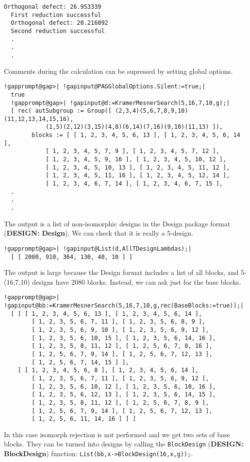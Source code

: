 \documentclass[a4paper,11pt]{report}
\begin{document}
{{\begin{Verbatim}[commandchars=@|A,fontsize=\small,frame=single,label=Example]
  Orthogonal defect: 26.953339
  First reduction successful
  Orthogonal defect: 20.216092
  Second reduction successful
  .
  .
  .
\end{Verbatim}
 Comments during the calculation can be supressed by setting global options. 
\begin{Verbatim}[commandchars=!@|,fontsize=\small,frame=single,label=Example]
  !gapprompt@gap>| !gapinput@PAGGlobalOptions.Silent:=true;|
  true
  !gapprompt@gap>| !gapinput@d:=KramerMesnerSearch(5,16,7,10,g);|
  [ rec( autSubgroup := Group([ (2,3,4)(5,6,7,8,9,10)(11,12,13,14,15,16), 
            (1,5)(2,12)(3,15)(4,8)(6,14)(7,16)(9,10)(11,13) ]), 
        blocks := [ [ 1, 2, 3, 4, 5, 6, 13 ], [ 1, 2, 3, 4, 5, 6, 14 ], 
            [ 1, 2, 3, 4, 5, 7, 9 ], [ 1, 2, 3, 4, 5, 7, 12 ], 
            [ 1, 2, 3, 4, 5, 9, 16 ], [ 1, 2, 3, 4, 5, 10, 12 ], 
            [ 1, 2, 3, 4, 5, 10, 13 ], [ 1, 2, 3, 4, 5, 11, 12 ], 
            [ 1, 2, 3, 4, 5, 11, 16 ], [ 1, 2, 3, 4, 5, 12, 14 ], 
            [ 1, 2, 3, 4, 6, 7, 14 ], [ 1, 2, 3, 4, 6, 7, 15 ], 
  .
  .
  .
\end{Verbatim}
 The output is a list of non-isomorphic designs in the \textsf{Design} package format  (\textbf{DESIGN: Design}). We can check that it is really a 5-design. 
\begin{Verbatim}[commandchars=!@|,fontsize=\small,frame=single,label=Example]
  !gapprompt@gap>| !gapinput@List(d,AllTDesignLambdas);|
  [ [ 2080, 910, 364, 130, 40, 10 ] ]
\end{Verbatim}
 The output is large because the \textsf{Design} format includes a list of all blocks, and 5-(16,7,10) designs have 2080
blocks. Instead, we can ask just for the base blocks. 
\begin{Verbatim}[commandchars=!@|,fontsize=\small,frame=single,label=Example]
  !gapprompt@gap>| !gapinput@bb:=KramerMesnerSearch(5,16,7,10,g,rec(BaseBlocks:=true));|
  [ [ [ 1, 2, 3, 4, 5, 6, 13 ], [ 1, 2, 3, 4, 5, 6, 14 ], 
        [ 1, 2, 3, 5, 6, 7, 11 ], [ 1, 2, 3, 5, 6, 8, 9 ], 
        [ 1, 2, 3, 5, 6, 9, 10 ], [ 1, 2, 3, 5, 6, 9, 12 ], 
        [ 1, 2, 3, 5, 6, 10, 15 ], [ 1, 2, 3, 5, 6, 14, 16 ], 
        [ 1, 2, 3, 5, 8, 11, 12 ], [ 1, 2, 5, 6, 7, 8, 16 ], 
        [ 1, 2, 5, 6, 7, 9, 14 ], [ 1, 2, 5, 6, 7, 12, 13 ], 
        [ 1, 2, 5, 6, 7, 14, 15 ] ], 
    [ [ 1, 2, 3, 4, 5, 6, 8 ], [ 1, 2, 3, 4, 5, 6, 14 ], 
        [ 1, 2, 3, 5, 6, 7, 11 ], [ 1, 2, 3, 5, 6, 9, 12 ], 
        [ 1, 2, 3, 5, 6, 10, 12 ], [ 1, 2, 3, 5, 6, 10, 16 ], 
        [ 1, 2, 3, 5, 6, 12, 13 ], [ 1, 2, 3, 5, 6, 14, 15 ], 
        [ 1, 2, 3, 5, 8, 11, 12 ], [ 1, 2, 5, 6, 7, 8, 9 ], 
        [ 1, 2, 5, 6, 7, 9, 14 ], [ 1, 2, 5, 6, 7, 12, 13 ], 
        [ 1, 2, 5, 6, 11, 14, 16 ] ] ]
\end{Verbatim}
 In this case isomorph rejection is not performed and we get two sets of base
blocks. They can be turned into designs by calling the \texttt{BlockDesign} (\textbf{DESIGN: BlockDesign}) function: \texttt{List(bb,x-{\textgreater}BlockDesign(16,x,g));}. }

}
\end{document}
